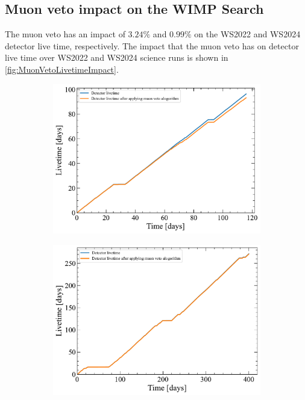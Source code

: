 \subsection{Muon veto impact on the WIMP Search}
The muon veto has an impact of $3.24\%$ and $0.99\%$ on the WS2022 and WS2024 detector live time, respectively. The impact that the muon veto has on detector live time over WS2022 and WS2024 science runs is shown in \autoref{fig:MuonVetoLivetimeImpact}.

\begin{figure}[h!]
\centering
\begin{subfigure}{0.47\textwidth}
    \includegraphics[width=\textwidth]{figures/Muons/SR1WSAnalysis_SR1-WSv5_LZAP-5.4.6_v36_run_time_comparison.pdf}
    \caption{}
    \label{fig:WS2022_MuonVetoLivetimeImpact}
\end{subfigure}
\hfill
\begin{subfigure}{0.47\textwidth}
    \includegraphics[width=\textwidth]{figures/Muons/SR3-WSv9_LZAP-5.8.0_allfiles_Final_run_time_comparison.pdf}

\end{subfigure}
\end{figure}
